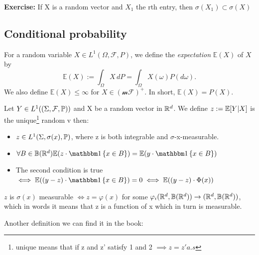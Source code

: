 \documentclass{article}
\begin{document}
\textbf{Exercise:} If X is a random vector and $X_{1}$ the rth entry, then \(\sigma(X_{1})\subset \sigma(X)\)

\subsection{Conditional probability}

\begin{definition}
    For a random variable \( X \in L^1(\Omega, \mathcal{F}, P) \), we define the \emph{expectation} \(\mathbb{E}(X)\) of \(X\) by
    \[
    \mathbb{E}(X) := \int_\Omega X \, dP = \int_\Omega X(\omega) P(d\omega).
    \]
    We also define \(\mathbb{E}(X) \leq \infty\) for \(X \in (\mathcal{mF})^+ \). In short, \(\mathbb{E}(X) = P(X)\).
    \end{definition}


\begin{definition}
    Let \(Y \in L^{1}((\Sigma, \mathcal{F}, \mathbb{P}))\) and X be a random vector in $\mathbb{R}^{d}$. We define \(z:=\mathbb{E}[Y|X]\) is the unique\footnote{unique means that if z and z' satisfy 1 and 2 $\implies z=z' a.s$} random v then: 
    \begin{itemize}
        \item \(z \in L^{1}(\Sigma, \sigma(x), \mathbb{P})\), where z is both integrable and $\sigma$-x-measurable. 
        \item \(\forall B \in \mathbb{B}(\R^{d}) \E(z \cdot \indf\left\{x\in B\right\})=\E(y \cdot \indf\left\{x\in B\right\})\)
        \item The second condition is true \(\iff \E((y-z) \cdot \indf \left\{x\in B\right\})=0 \iff \E((y-z) \cdot \Phi(x))\)
    \end{itemize}
\end{definition}


\begin{remark}
    \(z\) is \(\sigma(x)\) measurable \(\iff z=\varphi(x)\) for some \(\varphi_{i}(\mathbb{R}^{d}, \mathbb{B}(\mathbb{R}^{d}))\rightarrow (\mathbb{R}^{d}, \mathbb{B}(\mathbb{R}^{d}))\), which in words it means that z is a function of x which in turn is measurable. 
\end{remark}

Another definition we can find it in the book: 
\end{document}
